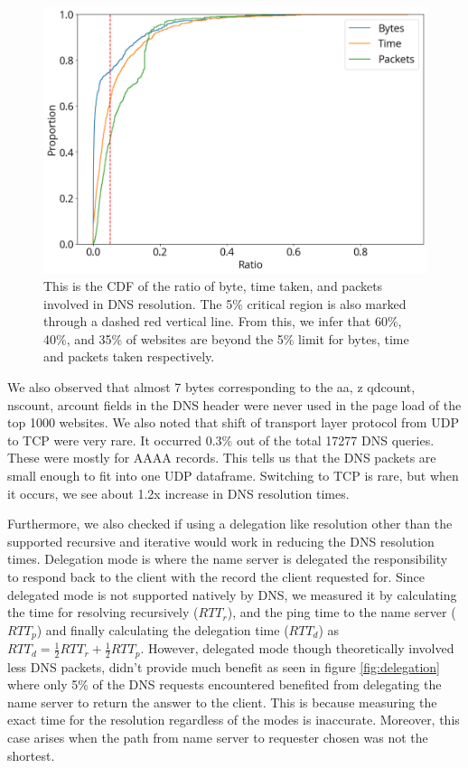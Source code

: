 \documentclass[conference]{IEEEtran}
\begin{document}
\begin{figure}[htbp]
    \centering
    \includegraphics[width=1\linewidth]{images/bytes-time-packets.png}
    \caption{This is the CDF of the ratio of byte, time taken, and packets involved in DNS resolution. The 5\% critical region is also marked through a dashed red vertical line. From this, we infer
    that 60\%, 40\%, and 35\% of websites are beyond the
    5\% limit for bytes, time and packets taken respectively.}
    \label{fig:bytes-time-packets}
\end{figure}

We also observed that almost 7 bytes corresponding to the aa, z qdcount, nscount, arcount fields in the DNS header were never used in the page load of the top 1000 websites. We also noted that shift of transport layer protocol from UDP to TCP were very rare. It occurred 0.3\% out of the total 17277 DNS queries. These were mostly for AAAA records. This tells us that the DNS packets are small enough to fit into one UDP dataframe. Switching to TCP is rare, but when it occurs, we see about 1.2x increase in DNS resolution times.

Furthermore, we also checked if using a delegation like resolution other than the supported recursive and iterative would work in reducing the DNS resolution times. Delegation mode is where the name server is delegated the responsibility to respond back to the client with the record the client requested for. Since delegated mode is not supported natively by DNS, we measured it by calculating the time for resolving recursively ($RTT_r$), and the ping time to the name server ($RTT_p$) and finally calculating the delegation time ($RTT_d$) as $RTT_d = \frac{1}{2}RTT_r + \frac{1}{2}RTT_p$. However, delegated mode though theoretically involved less DNS packets, didn't provide much benefit as seen in figure \ref{fig:delegation} where only 5\% of the DNS requests encountered benefited from delegating the name server to return the answer to the client. This is because measuring the exact time for the resolution regardless of the modes is inaccurate. Moreover, this case arises when the path from name server to requester chosen was not the shortest.
\end{document}
